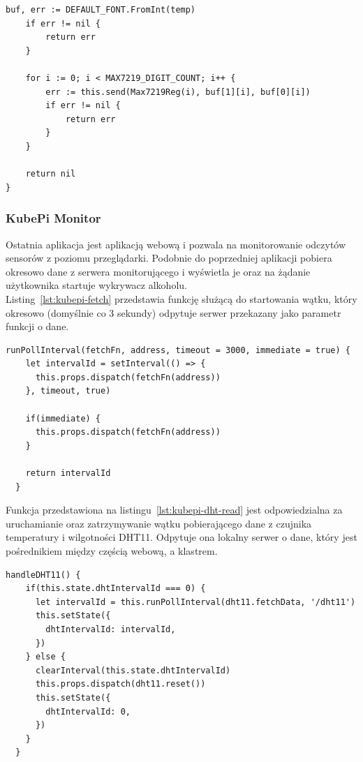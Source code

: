 \documentclass[12pt]{report}
\let\Oldsubsubsection\subsubsection
\renewcommand{\subsubsection}{\FloatBarrier\Oldsubsubsection}
\begin{document}
{\begin{lstlisting}[language=golang,caption=Wyświetlanie temperatury,label=lst:led-display]
	buf, err := DEFAULT_FONT.FromInt(temp)
	if err != nil {
		return err
	}

	for i := 0; i < MAX7219_DIGIT_COUNT; i++ {
		err := this.send(Max7219Reg(i), buf[1][i], buf[0][i])
		if err != nil {
			return err
		}
	}

	return nil
}
\end{lstlisting}

\newpage
\subsubsection{KubePi Monitor} \label{subsect:kubepi-monitor}
Ostatnia aplikacja jest aplikacją webową i pozwala na monitorowanie odczytów sensorów z poziomu przeglądarki. Podobnie do poprzedniej aplikacji pobiera okresowo dane z serwera monitorującego i wyświetla je oraz na żądanie użytkownika startuje wykrywacz alkoholu. \\

\noindent Listing~\ref{lst:kubepi-fetch} przedstawia funkcję służącą do startowania wątku, który okresowo (domyślnie co 3 sekundy) odpytuje serwer przekazany jako parametr funkcji o dane.
\begin{lstlisting}[language=golang,caption=Startowanie wątków do odczytu danych,label=lst:kubepi-fetch]
  runPollInterval(fetchFn, address, timeout = 3000, immediate = true) {
    let intervalId = setInterval(() => {
      this.props.dispatch(fetchFn(address))
    }, timeout, true)

    if(immediate) {
      this.props.dispatch(fetchFn(address))
    }

    return intervalId
  }
\end{lstlisting}

\noindent Funkcja przedstawiona na listingu~\ref{lst:kubepi-dht-read} jest odpowiedzialna za uruchamianie oraz zatrzymywanie wątku pobierającego dane z czujnika temperatury i wilgotności DHT11. Odpytuje ona lokalny serwer o dane, który jest pośrednikiem między częścią webową, a klastrem.
\begin{lstlisting}[language=golang,caption=Startowanie wątku odpytującego nasz serwer o dane z sensora DHT11,label=lst:kubepi-dht-read]
  handleDHT11() {
    if(this.state.dhtIntervalId === 0) {
      let intervalId = this.runPollInterval(dht11.fetchData, '/dht11')
      this.setState({
        dhtIntervalId: intervalId,
      })
    } else {
      clearInterval(this.state.dhtIntervalId)
      this.props.dispatch(dht11.reset())
      this.setState({
        dhtIntervalId: 0,
      })
    }
  }
\end{lstlisting}

}
\end{document}
